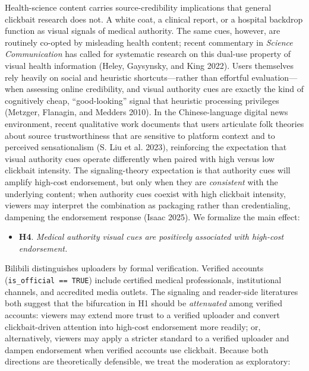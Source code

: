 \documentclass[
  12pt,
]{article}
\providecommand{\tightlist}{%
  \setlength{\itemsep}{0pt}\setlength{\parskip}{0pt}}
\begin{document}
Health-science content carries source-credibility implications that
general clickbait research does not. A white coat, a clinical report, or
a hospital backdrop function as visual signals of medical authority. The
same cues, however, are routinely co-opted by misleading health content;
recent commentary in \emph{Science Communication} has called for
systematic research on this dual-use property of visual health
information (Heley, Gaysynsky, and King 2022). Users themselves rely
heavily on social and heuristic shortcuts---rather than effortful
evaluation---when assessing online credibility, and visual authority
cues are exactly the kind of cognitively cheap, ``good-looking'' signal
that heuristic processing privileges (Metzger, Flanagin, and Medders
2010). In the Chinese-language digital news environment, recent
qualitative work documents that users articulate folk theories about
source trustworthiness that are sensitive to platform context and to
perceived sensationalism (S. Liu et al. 2023), reinforcing the
expectation that visual authority cues operate differently when paired
with high versus low clickbait intensity. The signaling-theory
expectation is that authority cues will amplify high-cost endorsement,
but only when they are \emph{consistent} with the underlying content;
when authority cues coexist with high clickbait intensity, viewers may
interpret the combination as packaging rather than credentialing,
dampening the endorsement response (Isaac 2025). We formalize the main
effect:

\begin{itemize}
\tightlist
\item
  \textbf{H4}. \emph{Medical authority visual cues are positively
  associated with high-cost endorsement.}
\end{itemize}

Bilibili distinguishes uploaders by formal verification. Verified
accounts (\texttt{is\_official\ ==\ TRUE}) include certified medical
professionals, institutional channels, and accredited media outlets. The
signaling and reader-side literatures both suggest that the bifurcation
in H1 should be \emph{attenuated} among verified accounts: viewers may
extend more trust to a verified uploader and convert clickbait-driven
attention into high-cost endorsement more readily; or, alternatively,
viewers may apply a stricter standard to a verified uploader and dampen
endorsement when verified accounts use clickbait. Because both
directions are theoretically defensible, we treat the moderation as
exploratory:
\end{document}
